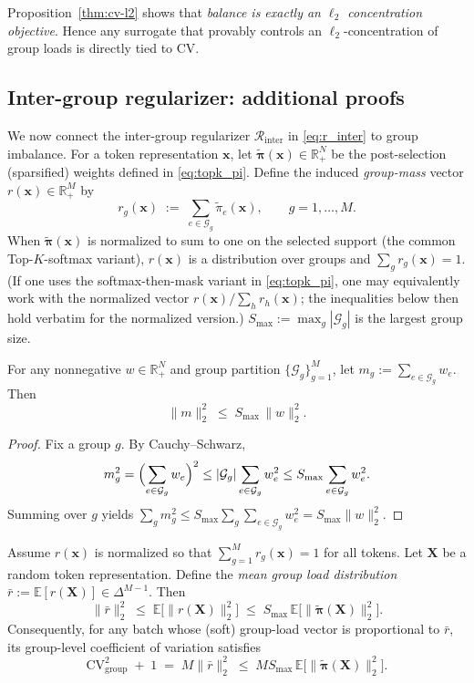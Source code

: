 \documentclass[sigconf,nonacm]{acmart}
\begin{document}
Proposition~\ref{thm:cv-l2} shows that \emph{balance is exactly an $\ell_2$ concentration objective}.
Hence any surrogate that provably controls an $\ell_2$-concentration of group loads is directly tied to CV.
\subsection{Inter-group regularizer: additional proofs}
\label{sec:theory-inter}

We now connect the inter-group regularizer $\mathcal{R}_{\text{inter}}$ in \eqref{eq:r_inter}
to group imbalance.
For a token representation $\mathbf{x}$, let $\widetilde{\bm{\pi}}(\mathbf{x})\in\mathbb{R}_+^N$ be the
post-selection (sparsified) weights defined in \eqref{eq:topk_pi}.
Define the induced \emph{group-mass} vector
$r(\mathbf{x})\in\mathbb{R}_+^M$ by
\[
r_g(\mathbf{x}) \;:=\; \sum_{e\in\mathcal{G}_g}\widetilde{\pi}_e(\mathbf{x}),\qquad g=1,\dots,M.
\]
When $\widetilde{\bm{\pi}}(\mathbf{x})$ is normalized to sum to one on the selected support (the common Top-$K$-softmax variant),
$r(\mathbf{x})$ is a distribution over groups and $\sum_g r_g(\mathbf{x})=1$.
(If one uses the softmax-then-mask variant in \eqref{eq:topk_pi}, one may equivalently work with the normalized vector
$r(\mathbf{x})/\sum_h r_h(\mathbf{x})$; the inequalities below then hold verbatim for the normalized version.) $S_{\max}:=\max_{g}|\mathcal{G}_g|$ is the largest group size.

\begin{lemma}
\label{lem:group-sum-bound}
For any nonnegative $w\in\mathbb{R}_+^N$ and group partition $\{\mathcal{G}_g\}_{g=1}^M$, let
$m_g := \sum_{e\in\mathcal{G}_g} w_e$. Then
\[
\|m\|_2^2 \;\le\; S_{\max}\,\|w\|_2^2.
\]
\end{lemma}

\begin{proof}
Fix a group $g$. By Cauchy--Schwarz,
\[
m_g^2 = \Bigl(\sum_{e\in\mathcal{G}_g} w_e\Bigr)^2
\le |\mathcal{G}_g|\sum_{e\in\mathcal{G}_g} w_e^2
\le S_{\max}\sum_{e\in\mathcal{G}_g} w_e^2.
\]
Summing over $g$ yields
$\sum_g m_g^2 \le S_{\max}\sum_{g}\sum_{e\in\mathcal{G}_g} w_e^2 = S_{\max}\|w\|_2^2$.
\end{proof}

\begin{theorem}
\label{thm:inter-controls-cv}
Assume $r(\mathbf{x})$ is normalized so that $\sum_{g=1}^M r_g(\mathbf{x})=1$ for all tokens.
Let $\mathbf{X}$ be a random token representation.
Define the \emph{mean group load distribution} $\bar r := \mathbb{E}[r(\mathbf{X})]\in\Delta^{M-1}$.
Then
\[
\|\bar r\|_2^2
\;\le\;
\mathbb{E}\bigl[\|r(\mathbf{X})\|_2^2\bigr]
\;\le\;
S_{\max}\,\mathbb{E}\bigl[\|\widetilde{\bm{\pi}}(\mathbf{X})\|_2^2\bigr].
\]
Consequently, for any batch whose (soft) group-load vector is proportional to $\bar r$, its group-level coefficient of
variation satisfies
\[
\mathrm{CV}_{\text{group}}^2 \;+\; 1
\;=\;
M\|\bar r\|_2^2
\;\le\;
M S_{\max}\,\mathbb{E}\bigl[\|\widetilde{\bm{\pi}}(\mathbf{X})\|_2^2\bigr].
\]
\end{theorem}
\end{document}
